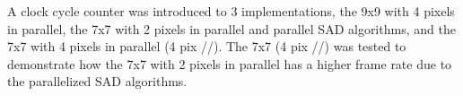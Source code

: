 
A clock cycle counter was introduced to 3 implementations, the 9x9 with 4 pixels in parallel, the 7x7 with 2 pixels in parallel and parallel SAD algorithms, and the 7x7 with 4 pixels in parallel (4 pix //). The 7x7 (4 pix //) was tested to demonstrate how the 7x7 with 2 pixels in parallel has a higher frame rate due to the parallelized SAD algorithms. 

